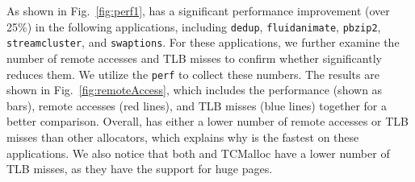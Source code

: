 As shown in Fig.~\ref{fig:perf1}, \NM{} has a significant performance improvement (over 25\%) in the following applications, including \texttt{dedup}, \texttt{fluidanimate}, \texttt{pbzip2}, \texttt{streamcluster}, and \texttt{swaptions}. For these applications, we further examine the number of remote accesses and TLB misses to confirm whether \NM{} significantly reduces them. 
We utilize the \texttt{perf} to collect these numbers. 
The results are shown in Fig.~\ref{fig:remoteAccess}, which includes the performance (shown as bars), remote accesses (red lines), and TLB misses (blue lines) together for a better comparison. 
Overall, \NM{} has either a lower number of remote accesses or TLB misses than other allocators, which explains why \NM{} is the fastest on these applications. We also notice that both \NM{} and TCMalloc have a lower number of TLB misses, as they have the support for huge pages.   

